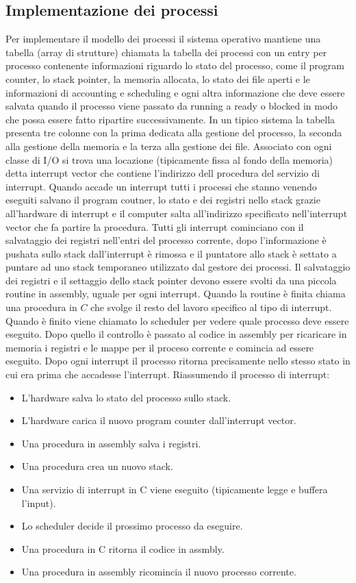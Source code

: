 \subsection{Implementazione dei processi}
Per implementare il modello dei processi il sistema operativo mantiene una tabella (array di strutture) chiamata la tabella dei processi con un entry per processo contenente 
informazioni riguardo lo stato del processo, come il program counter, lo stack pointer, la memoria allocata, lo stato dei file aperti e le informazioni di accounting e scheduling e
ogni altra informazione che deve essere salvata quando il processo viene passato da running a ready o blocked in modo che possa essere fatto ripartire successivamente. In un tipico 
sistema la tabella presenta tre colonne con la prima dedicata alla gestione del processo, la seconda alla gestione della memoria e la terza alla gestione dei file. Associato con ogni
classe di I/O si trova una locazione (tipicamente fissa al fondo della memoria) detta interrupt vector che contiene l'indirizzo dell procedura del servizio di interrupt. Quando accade
un interrupt tutti i processi che stanno venendo eseguiti salvano il program coutner, lo stato e dei registri nello stack grazie all'hardware di interrupt e il computer salta 
all'indirizzo specificato nell'interrupt vector che fa partire la procedura. Tutti gli interrupt cominciano con il salvataggio dei registri nell'entri del processo corrente, dopo 
l'informazione \`e pushata sullo stack dall'interrupt \`e rimossa e il puntatore allo stack \`e settato a puntare ad uno stack temporaneo utilizzato dal gestore dei processi. Il 
salvataggio dei registri e il settaggio dello stack pointer devono essere svolti da una piccola routine in assembly, uguale per ogni interrupt. Quando la routine \`e finita chiama una
procedura in $C$ che svolge il resto del lavoro specifico al tipo di interrupt. Quando \`e finito viene chiamato lo scheduler per vedere quale processo deve essere eseguito. Dopo
quello il controllo \`e passato al codice in assembly per ricaricare in memoria i registri e le mappe per il proceso corrente e comincia ad essere eseguito. Dopo ogni interrupt il
processo ritorna precisamente nello stesso stato in cui era prima che accadesse l'interrupt. Riassumendo il processo di interrupt:
\begin{itemize}
	\item L'hardware salva lo stato del processo sullo stack.
	\item L'hardware carica il nuovo program counter dall'interrupt vector.
	\item Una procedura in assembly salva i registri.
	\item Una procedura crea un nuovo stack.
	\item Una servizio di interrupt in C viene eseguito (tipicamente legge e buffera l'input).
	\item Lo scheduler decide il prossimo processo da eseguire.
	\item Una procedura in C ritorna il codice in assmbly.
	\item Una procedura in assembly ricomincia il nuovo processo corrente.
\end{itemize}
